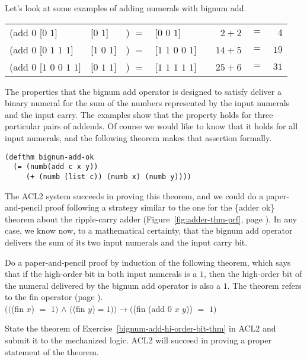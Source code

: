 Let's look at some examples of adding numerals with bignum \textsf{add}.
\begin{center}
\begin{tabular}{llll|rcr}
\textsf{(add $0$ [$0$ $1$]}             &\textsf{[$0$ $1$]}    &\textsf{)} $=$ &\textsf{[$0$ $0$ $1$]}         & ~~$2 + 2$  &$=$& $4$   \\
\textsf{(add $0$ [$0$ $1$ $1$ $1$]}     &\textsf{[$1$ $0$ $1$]}&\textsf{)} $=$ &\textsf{[$1$ $1$ $0$ $0$ $1$]} & ~~$14 + 5$ &$=$& $19$ \\
\textsf{(add $0$ [$1$ $0$ $0$ $1$ $1$]} &\textsf{[$0$ $1$ $1$]}&\textsf{)} $=$ &\textsf{[$1$ $1$ $1$ $1$ $1$]} & ~~$25 + 6$ &$=$& $31$ \\
\end{tabular}
\end{center}

The properties that the bignum \textsf{add} operator is designed to satisfy
deliver a binary numeral for the sum of
the numbers represented by the input numerals and the input carry.
The examples show that the property holds for three
particular pairs of addends.
Of course we would like to know that it
holds for all input numerals, and
the following theorem makes that assertion formally.

\label{bignum-adder-thm}
\begin{Verbatim}
(defthm bignum-add-ok
  (= (numb(add c x y))
     (+ (numb (list c)) (numb x) (numb y))))
\end{Verbatim}

The ACL2 system succeeds in proving this theorem,
and we could do a paper-and-pencil proof following a strategy
similar to the one for the \{adder ok\} theorem about the ripple-carry adder
(Figure~\ref{fig:adder-thm-prf}, page \pageref{fig:adder-thm-prf}).
In any case, we know now, to a mathematical certainty,
that the bignum \textsf{add} operator delivers
the sum of its two input numerals and the input carry bit.

\begin{ExerciseList}
\Exercise \label{bignum-add-hi-order-bit-thm}
Do a paper-and-pencil proof by induction of the following
theorem, which says that if the high-order bit in both input numerals is a $1$,
then the high-order bit of the numeral delivered
by the bignum \textsf{add} operator is also a $1$.
The theorem refers to the \textsf{fin} operator (page \pageref{fin-defun}).\\
\hspace*{1cm}$(($\textsf{(fin $x$) $=$ $1)$ $\wedge$ $($(fin $y$)}$= 1))
\rightarrow ($\textsf{(fin (add 0 $x$ $y$))} $=$ $1)$

\Exercise State the theorem of Exercise~\ref{bignum-add-hi-order-bit-thm}
in ACL2 and submit it to the mechanized logic.
ACL2 will succeed in proving a proper statement of the theorem.
\end{ExerciseList}

